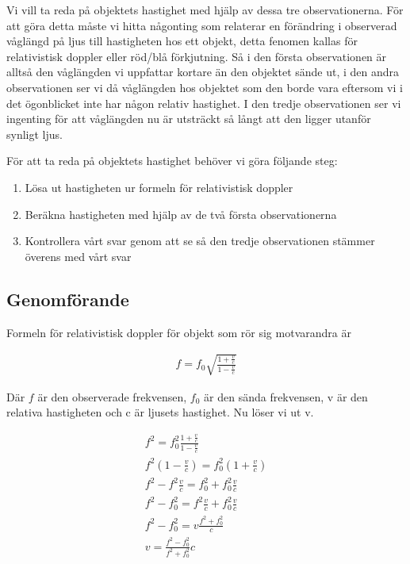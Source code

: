 \documentclass[a4paper]{article}
\begin{document}
Vi vill ta reda på objektets hastighet med hjälp av dessa tre observationerna. För att göra detta måste vi hitta någonting som relaterar en förändring i observerad våglängd på ljus till hastigheten hos ett objekt, detta fenomen kallas för relativistisk doppler eller röd/blå förkjutning. Så i den första observationen är alltså den våglängden vi uppfattar kortare än den objektet sände ut, i den andra observationen ser vi då våglängden hos objektet som den borde vara eftersom vi i det ögonblicket inte har någon relativ hastighet. I den tredje observationen ser vi ingenting för att våglängden nu är utsträckt så långt att den ligger utanför synligt ljus. 

För att ta reda på objektets hastighet behöver vi göra följande steg:

\begin{enumerate}
    \item Lösa ut hastigheten ur formeln för relativistisk doppler
    \item Beräkna hastigheten med hjälp av de två första observationerna
    \item Kontrollera vårt svar genom att se så den tredje observationen stämmer överens med vårt svar
\end{enumerate}


\subsection{Genomförande}

Formeln för relativistisk doppler för objekt som rör sig motvarandra är

\begin{align*}
    f = f_0 \sqrt{\frac{1 + \frac{v}{c}}{1 - \frac{v}{c}}}
\end{align*}

Där $f$ är den observerade frekvensen, $f_0$ är den sända frekvensen, v är den relativa hastigheten och c är ljusets hastighet. Nu löser vi ut v.

\begin{align*}
    f^2 = f_0^2 \frac{1 + \frac{v}{c}}{1 - \frac{v}{c}} \\
    f^2 (1 - \frac{v}{c}) = f_0^2 (1 + \frac{v}{c}) \\
    f^2 - f^2 \frac{v}{c} = f_0^2 + f_0^2 \frac{v}{c} \\
    f^2 - f_0^2 = f^2 \frac{v}{c} + f_0^2 \frac{v}{c} \\
    f^2 - f_0^2 = v \frac{f^2 + f_0^2}{c} \\
    v = \frac{f^2 - f_0^2}{f^2 + f_0^2} c
\end{align*}
\end{document}
